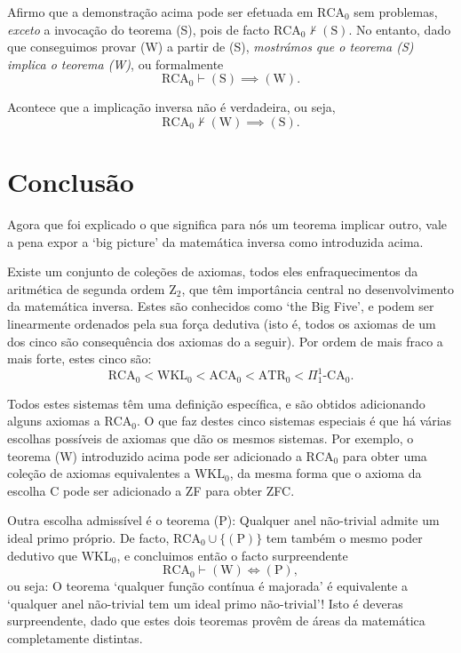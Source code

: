 Afirmo que a demonstração acima pode ser efetuada em $\mathrm{RCA}_0$ sem problemas, \emph{exceto} a invocação do teorema (S), pois de facto $\mathrm{RCA}_0 \nvdash (\mathrm{S})$. No entanto, dado que conseguimos provar (W) a partir de (S), \emph{mostrámos que o teorema \textrm{(S)} implica o teorema \textrm{(W)}}, ou formalmente
\begin{equation}
\mathrm{RCA}_0 \vdash (\mathrm{S}) \implies (\mathrm{W}).
\end{equation}

Acontece que a implicação inversa não é verdadeira, ou seja,
\begin{equation}
\mathrm{RCA}_0 \nvdash (\mathrm{W}) \implies (\mathrm{S}).
\end{equation}

\section*{Conclusão}

Agora que foi explicado o que significa para nós um teorema implicar outro, vale a pena expor a `big picture' da matemática inversa como introduzida acima.

Existe um conjunto de coleções de axiomas, todos eles enfraquecimentos da aritmética de segunda ordem $\mathrm{Z}_2$, que têm importância central no desenvolvimento da matemática inversa. Estes são conhecidos como `the Big Five', e podem ser linearmente ordenados pela sua força dedutiva (isto é, todos os axiomas de um dos cinco são consequência dos axiomas do a seguir). Por ordem de mais fraco a mais forte, estes cinco são:
\begin{equation}
\mathrm{RCA}_0 < \mathrm{WKL}_0 < \mathrm{ACA}_0 < \mathrm{ATR}_0 < \Pi^1_1\text{-}\mathrm{CA}_0.
\end{equation}

Todos estes sistemas têm uma definição específica, e são obtidos adicionando alguns axiomas a $\mathrm{RCA}_0$. O que faz destes cinco sistemas especiais é que há várias escolhas possíveis de axiomas que dão os mesmos sistemas. Por exemplo, o teorema (W) introduzido acima pode ser adicionado a $\mathrm{RCA}_0$ para obter uma coleção de axiomas equivalentes a $\mathrm{WKL}_0$, da mesma forma que o axioma da escolha C pode ser adicionado a ZF para obter ZFC.

Outra escolha admissível é o teorema (P): Qualquer anel não-trivial admite um ideal primo próprio. De facto, $\mathrm{RCA}_0 \cup \{(\mathrm{P})\}$ tem também o mesmo poder dedutivo que $\mathrm{WKL}_0$, e concluimos então o facto surpreendente
\begin{equation}
\mathrm{RCA}_0 \vdash (\mathrm{W}) \iff (\mathrm{P}),
\end{equation}
ou seja: O teorema `qualquer função contínua é majorada' é equivalente a `qualquer anel não-trivial tem um ideal primo não-trivial'! Isto é deveras surpreendente, dado que estes dois teoremas provêm de áreas da matemática completamente distintas.

